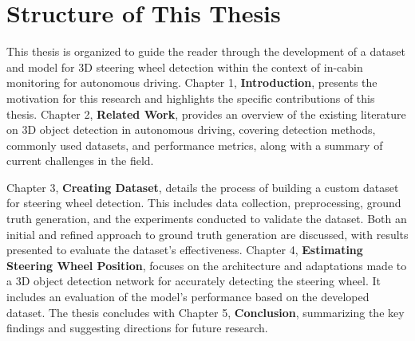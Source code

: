 \section{Structure of This Thesis}
This thesis is organized to guide the reader through the development of a dataset and model for 3D steering wheel detection within the context of in-cabin monitoring for autonomous driving. Chapter 1, \textbf{Introduction}, presents the motivation for this research and highlights the specific contributions of this thesis. Chapter 2, \textbf{Related Work}, provides an overview of the existing literature on 3D object detection in autonomous driving, covering detection methods, commonly used datasets, and performance metrics, along with a summary of current challenges in the field.

Chapter 3, \textbf{Creating Dataset}, details the process of building a custom dataset for steering wheel detection. This includes data collection, preprocessing, ground truth generation, and the experiments conducted to validate the dataset. Both an initial and refined approach to ground truth generation are discussed, with results presented to evaluate the dataset’s effectiveness. Chapter 4, \textbf{Estimating Steering Wheel Position}, focuses on the architecture and adaptations made to a 3D object detection network for accurately detecting the steering wheel. It includes an evaluation of the model’s performance based on the developed dataset. The thesis concludes with Chapter 5, \textbf{Conclusion}, summarizing the key findings and suggesting directions for future research.




